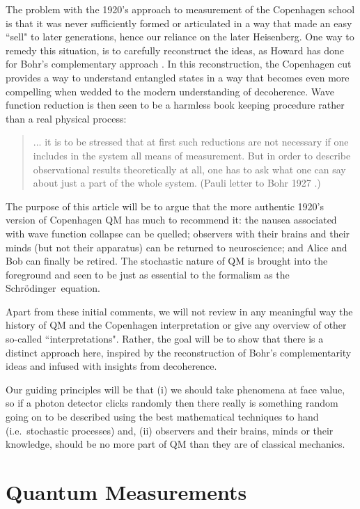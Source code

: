 \documentclass[12pt]{article}
\theoremstyle{plain}
\theoremstyle{definition}
\theoremstyle{remark}
\def\SCH{Schr\"odinger\ }
\begin{document}
The problem with the 1920's approach to measurement of the Copenhagen school is that it was never sufficiently formed or articulated in a way that made an easy ``sell" to later generations, hence our reliance on the later Heisenberg. 
One way to remedy this situation, is to carefully reconstruct the ideas, as Howard has done for Bohr's complementary approach \cite{Howard2}. In this reconstruction, the Copenhagen cut provides a way to understand entangled states in a way that becomes even more compelling when wedded to the modern understanding of decoherence. 
Wave function reduction is then seen to be a harmless book keeping procedure rather than a real physical process: 
\begin{quote}
... it is to be stressed that at first such reductions are not necessary if one includes in the system all means of measurement. But in order to describe observational results theoretically at all, one has to ask what one can say about just a part of the whole system. (Pauli letter to Bohr 1927 \cite{Pauli}.)
\end{quote}

The purpose of this article will be to argue that the more authentic 1920's version of Copenhagen QM has much to recommend it: the nausea associated with wave function collapse can be quelled; observers with their brains and their minds (but not their apparatus) can be returned to neuroscience; and Alice and Bob can finally be retired. The stochastic nature of QM is brought into the foreground and seen to be just as essential to the formalism as the \SCH equation.

Apart from these initial comments, we will not review in any meaningful way the history of QM and the Copenhagen interpretation or give any overview of other so-called ``interpretations". Rather, the goal will be to show that there is a distinct approach here, inspired by the reconstruction of Bohr's complementarity ideas and infused with insights from decoherence. 

Our guiding principles will be that (i) we should take phenomena at face value, so if a photon detector clicks
randomly then there really is something random going on to be described using the best mathematical techniques to hand (i.e.~stochastic processes) and, (ii) observers and their brains, minds or their knowledge, should be no more part of QM than they are of classical mechanics. 

\section{Quantum Measurements}\label{s2}
\end{document}
